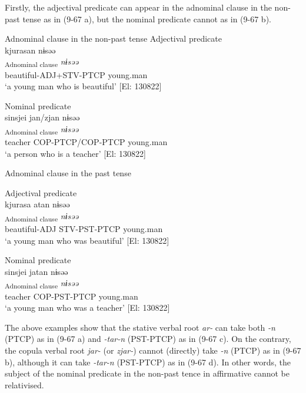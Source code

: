   Firstly, the adjectival predicate can appear in the adnominal clause in the non-past tense as in (9-67 a), but the nominal predicate cannot as in (9-67 b).

\ea  
\exi{} Adnominal clause in the non-past tense \label{ex:9.67}
\ea Adjectival predicate\\
 \glll  kjurasan  nɨsəə\\
    [\textit{kjura-sa+ar-n}]\textsubscript{Adnominal clause} \textit{nɨsəə}\\
    beautiful-ADJ+STV-PTCP  young.man\\
    \glt     ‘a young man who is beautiful’ [El: 130822]

\ex Nominal predicate\\
 \glll  *{\textbar}sinsjei{\textbar}  jan/zjan  nɨsəə\\
    [\textit{sinsjei}  \textit{jar-n}/\textit{zjar-n}]\textsubscript{Adnominal clause}  \textit{nɨsəə}\\
    teacher  COP-PTCP/COP-PTCP  young.man\\
     ‘a person who is a teacher’ [El: 130822]

\exi{} Adnominal clause in the past tense

\ex Adjectival predicate\\
 \glll  kjurasa  atan  nɨsəə\\
    [\textit{kjura-sa}  \textit{ar-tar-n}]\textsubscript{Adnominal clause}  \textit{nɨsəə}\\
    beautiful-ADJ  STV-PST-PTCP  young.man\\
    \glt     ‘a young man who was beautiful’ [El: 130822]

\ex Nominal predicate\\
 \glll  {\textbar}sinsjei{\textbar}  jatan  nɨsəə\\
    [\textit{sinsjei}  \textit{jar-tar-n}]\textsubscript{Adnominal clause}  \textit{nɨsəə}\\
    teacher  COP-PST-PTCP  young.man\\
    \glt      ‘a young man who was a teacher’ [El: 130822]
    \z
\z

The above examples show that the stative verbal root \textit{ar-} can take both \textit{{}-n} (PTCP) as in (9-67 a) and \textit{{}-tar-n} (PST-PTCP) as in (9-67 c). On the contrary, the copula verbal root \textit{jar-} (or \textit{zjar-}) cannot (directly) take \textit{{}-n} (PTCP) as in (9-67 b), although it can take \textit{{}-tar-n} (PST-PTCP) as in (9-67 d). In other words, the subject of the nominal predicate in the non-past tence in affirmative cannot be relativised.

